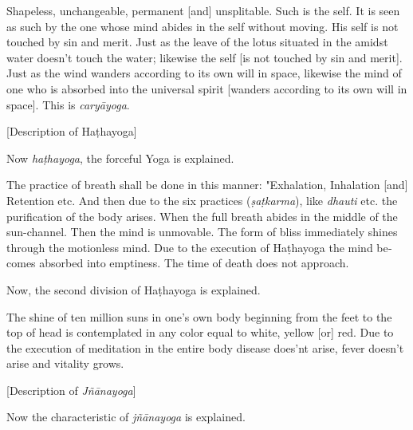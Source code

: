 \begin{otherlanguage}{english}
      \begin{tlate}
        Shapeless, unchangeable, permanent [and] unsplitable. Such is the self. It is seen as such by the one whose mind abides in the self without moving. His self is not touched by sin and merit. Just as the leave of the lotus situated in the amidst water doesn't touch the water; likewise the self [is not touched by sin and merit]. Just as the wind wanders according to its own will in space, likewise the mind of one who is absorbed into the universal spirit [wanders according to its own will in space]. This is \textit{caryāyoga}.
      \end{tlate}
       \bigskip
    \centerline{\textrm{\small{[Description of Haṭhayoga]}}}
      \bigskip
      \begin{tlate}
        Now \textit{haṭhayoga}, the forceful Yoga is explained. \\
    \end{tlate}
    \begin{tlate}
 The practice of breath shall be done in this manner: "Exhalation, Inhalation [and] Retention etc. And then due to the six practices (\textit{ṣaṭkarma}), like \textit{dhauti} etc. the purification of the body arises. When the full breath abides in the middle of the sun-channel. Then the mind is unmovable. The form of bliss immediately shines through the motionless mind. Due to the execution of Haṭhayoga the mind becomes absorbed into emptiness. The time of death does not approach.
    \end{tlate}
    \begin{tlate}
  Now, the second division of Haṭhayoga is explained.
    \end{tlate}
      \begin{tlate}      
        The shine of ten million suns in one's own body beginning from the feet to the top of head is contemplated in any color equal to white, yellow [or] red. Due to the execution of meditation in the entire body disease does'nt arise, fever doesn't arise and vitality grows.
      \end{tlate}
    \bigskip
        \centerline{\textrm{\small{[Description of \textit{Jñānayoga}]}}}
          \bigskip
    \begin{tlate}
Now the characteristic of \textit{jñānayoga} is explained. \\

\end{tlate}
\end{otherlanguage}
